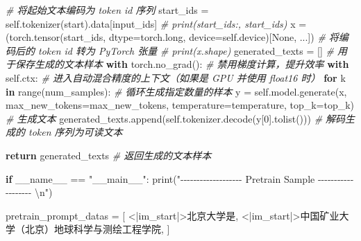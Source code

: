 \documentclass[
]{article}
\newenvironment{Shaded}{}{}
\newcommand{\BuiltInTok}[1]{\textcolor[rgb]{0.00,0.50,0.00}{#1}}
\newcommand{\CharTok}[1]{\textcolor[rgb]{0.25,0.44,0.63}{#1}}
\newcommand{\CommentTok}[1]{\textcolor[rgb]{0.38,0.63,0.69}{\textit{#1}}}
\newcommand{\ControlFlowTok}[1]{\textcolor[rgb]{0.00,0.44,0.13}{\textbf{#1}}}
\newcommand{\DecValTok}[1]{\textcolor[rgb]{0.25,0.63,0.44}{#1}}
\newcommand{\KeywordTok}[1]{\textcolor[rgb]{0.00,0.44,0.13}{\textbf{#1}}}
\newcommand{\NormalTok}[1]{#1}
\newcommand{\OperatorTok}[1]{\textcolor[rgb]{0.40,0.40,0.40}{#1}}
\newcommand{\StringTok}[1]{\textcolor[rgb]{0.25,0.44,0.63}{#1}}
\newcommand{\VariableTok}[1]{\textcolor[rgb]{0.10,0.09,0.49}{#1}}
\begin{document}
\begin{Shaded}
\begin{Highlighting}[]
        \CommentTok{\# 将起始文本编码为 token id 序列}
\NormalTok{        start\_ids }\OperatorTok{=} \VariableTok{self}\NormalTok{.tokenizer(start).data[}\StringTok{\textquotesingle{}input\_ids\textquotesingle{}}\NormalTok{]}
        \CommentTok{\# print(\textquotesingle{}start\_ids:\textquotesingle{}, start\_ids)}
\NormalTok{        x }\OperatorTok{=}\NormalTok{ (torch.tensor(start\_ids, dtype}\OperatorTok{=}\NormalTok{torch.}\BuiltInTok{long}\NormalTok{, device}\OperatorTok{=}\VariableTok{self}\NormalTok{.device)[}\VariableTok{None}\NormalTok{, ...])  }\CommentTok{\# 将编码后的 token id 转为 PyTorch 张量}
        \CommentTok{\# print(x.shape)}
\NormalTok{        generated\_texts }\OperatorTok{=}\NormalTok{ []  }\CommentTok{\# 用于保存生成的文本样本}
        \ControlFlowTok{with}\NormalTok{ torch.no\_grad():  }\CommentTok{\# 禁用梯度计算，提升效率}
            \ControlFlowTok{with} \VariableTok{self}\NormalTok{.ctx:  }\CommentTok{\# 进入自动混合精度的上下文（如果是 GPU 并使用 float16 时）}
                \ControlFlowTok{for}\NormalTok{ k }\KeywordTok{in} \BuiltInTok{range}\NormalTok{(num\_samples):  }\CommentTok{\# 循环生成指定数量的样本}
\NormalTok{                    y }\OperatorTok{=} \VariableTok{self}\NormalTok{.model.generate(x, max\_new\_tokens}\OperatorTok{=}\NormalTok{max\_new\_tokens, temperature}\OperatorTok{=}\NormalTok{temperature, top\_k}\OperatorTok{=}\NormalTok{top\_k)  }\CommentTok{\# 生成文本}
\NormalTok{                    generated\_texts.append(}\VariableTok{self}\NormalTok{.tokenizer.decode(y[}\DecValTok{0}\NormalTok{].tolist()))  }\CommentTok{\# 解码生成的 token 序列为可读文本}
        
        \ControlFlowTok{return}\NormalTok{ generated\_texts  }\CommentTok{\# 返回生成的文本样本}
    
\ControlFlowTok{if} \VariableTok{\_\_name\_\_} \OperatorTok{==} \StringTok{"\_\_main\_\_"}\NormalTok{:}
    \BuiltInTok{print}\NormalTok{(}\StringTok{"{-}{-}{-}{-}{-}{-}{-}{-}{-}{-}{-}{-}{-}{-}{-}{-}{-}{-}{-} Pretrain Sample {-}{-}{-}{-}{-}{-}{-}{-}{-}{-}{-}{-}{-}{-}{-}{-}{-}{-}{-} }\CharTok{\textbackslash{}n}\StringTok{"}\NormalTok{)}

\NormalTok{    pretrain\_prompt\_datas }\OperatorTok{=}\NormalTok{ [}
        \StringTok{\textquotesingle{}\textless{}|im\_start|\textgreater{}北京大学是\textquotesingle{}}\NormalTok{,}
        \StringTok{\textquotesingle{}\textless{}|im\_start|\textgreater{}中国矿业大学（北京）地球科学与测绘工程学院\textquotesingle{}}\NormalTok{,}
\NormalTok{    ]}


\end{Highlighting}
\end{Shaded}
\end{document}
